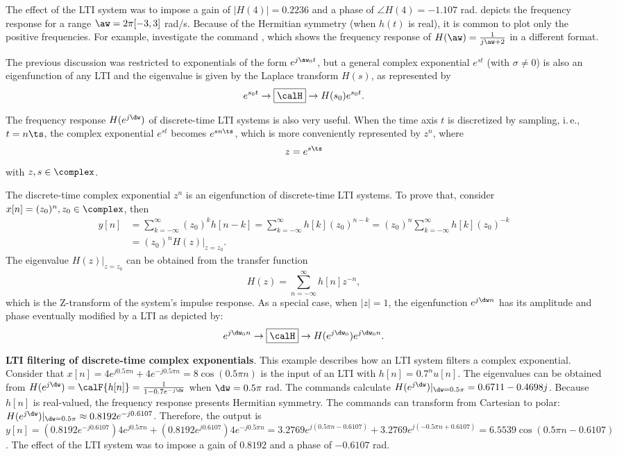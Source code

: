 The effect of the LTI system was to impose a gain of $|H(4)|=0.2236$ and a phase of $\angle{H(4)}=-1.107$ rad.
 depicts the frequency response for a range $\aw=2\pi[-3,3]$ rad/s. Because of the Hermitian symmetry (when $h(t)$ is real), it is common to plot only the positive frequencies. For example, investigate the command , which shows the frequency response of $H(\aw) = \frac{1}{j \aw + 2}$ in a different format.
\eExample 

The previous discussion was restricted to exponentials of the form $e^{j \aw_0 t}$, but a general complex exponential $e^{st}$ (with $\sigma \ne 0$) is also an eigenfunction of any LTI and the eigenvalue is given by the Laplace transform $H(s)$, as represented by
\[
e^{s_0 t} \rightarrow\boxed{\calH}\rightarrow H(s_0) e^{s_0 t}.
\]

The frequency response $H(e^{j\dw})$ of discrete-time LTI systems is also very useful. When the time axis $t$ is discretized by sampling, i.\,e., $t=n \ts$, the complex exponential $e^{st}$ becomes $e^{s n \ts}$, which is more conveniently represented by $z^n$, where 
\[
z=e^{s \ts}
\]
with $z,s \in \complex$.

The discrete-time complex exponential $z^n$ is an eigenfunction of discrete-time LTI systems. To prove that, consider $x[n]=(z_0)^n, z_0 \in \complex$, then
\begin{align*}
y[n] &= \sum_{k=-\infty}^{\infty} (z_0)^k h[n-k] = \sum_{k=-\infty}^{\infty} h[k] (z_0)^{n-k} = (z_0)^n \sum_{k=-\infty}^{\infty} h[k] (z_0)^{-k}\\
&=  (z_0)^n H(z)|_{z=z_0}.
\end{align*}
The eigenvalue $H(z)|_{z=z_0}$ can be obtained from the transfer function
\[
H(z) = \sum_{n=-\infty}^{\infty} h[n] z^{-n},
\]
which is the Z-transform of the system's impulse response. As a special case, when $|z|=1$, the eigenfunction $e^{j \dw n}$ has its amplitude and phase eventually modified by a LTI as depicted by:
\[
e^{j \dw_0 n} \rightarrow\boxed{\calH}\rightarrow H(e^{j \dw_0}) e^{j \dw_0 n}. 
\]

\bExample \textbf{LTI filtering of discrete-time complex exponentials}.
This example describes how an LTI system filters a complex exponential.
Consider that $x[n] = 4 e^{j 0.5 \pi n} + 4 e^{-j 0.5 \pi n} = 8 \cos(0.5 \pi n)$ is the input of an LTI with $h[n]=0.7^n u[n]$. The eigenvalues can be obtained from $H(e^{j\dw}) = \calF \{ h[n] \} = \frac{1}{1 - 0.7e^{-j\dw}}$ when $\dw=0.5 \pi$ rad. The {\matlab} commands  calculate $H(e^{j\dw})|_{\dw=0.5\pi}=0.6711 - 0.4698j$. Because $h[n]$ is real-valued, the frequency response presents Hermitian symmetry. The commands  can transform from Cartesian to polar: $H(e^{j\dw})|_{\dw=0.5\pi} \approx 0.8192 e^{-j0.6107}$. Therefore, the output is $y[n] = (0.8192 e^{-j0.6107}) 4 e^{j 0.5 \pi n} + (0.8192 e^{j0.6107}) 4 e^{-j 0.5 \pi n} = 3.2769 e^{j(0.5 \pi n - 0.6107)} + 3.2769 e^{j(-0.5 \pi n + 0.6107)} = 6.5539 \cos(0.5 \pi n - 0.6107)$. The effect of the LTI system was to impose a gain of $0.8192$ and a phase of $-0.6107$ rad.


